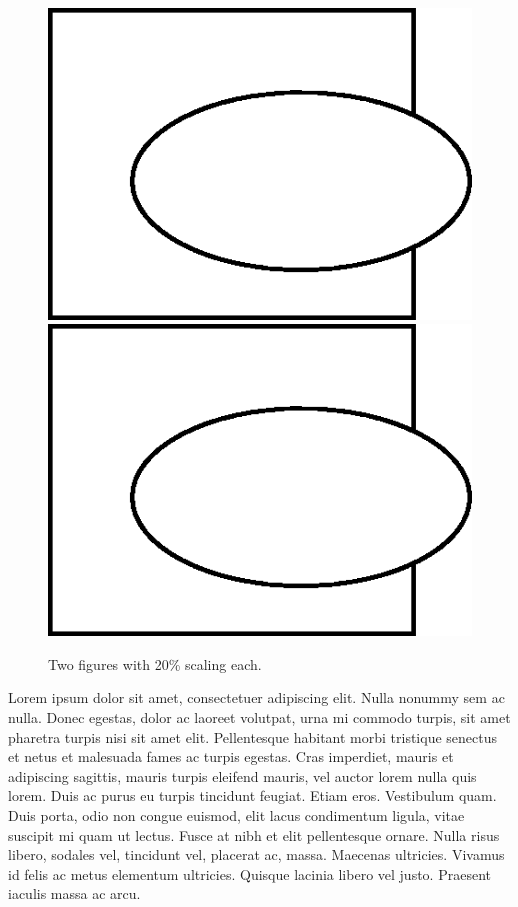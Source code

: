 \documentclass{article}
\begin{document}
\begin{figure}
\begin{center}
\includegraphics[scale=0.2]{fig_oval.png}
\includegraphics[scale=0.2]{fig_oval.png}
\end{center}
\caption{Two figures with 20\% scaling each.} 
\end{figure}

Lorem ipsum dolor sit amet, consectetuer adipiscing elit. 
Nulla nonummy sem ac nulla. Donec egestas, dolor ac laoreet volutpat, 
urna mi commodo turpis, sit amet pharetra turpis nisi sit amet elit. 
Pellentesque habitant morbi tristique senectus et netus et malesuada 
fames ac turpis egestas. Cras imperdiet, mauris et adipiscing sagittis, 
mauris turpis eleifend mauris, vel auctor lorem nulla quis lorem. 
Duis ac purus eu turpis tincidunt feugiat. Etiam eros. Vestibulum quam. 
Duis porta, odio non congue euismod, elit lacus condimentum ligula, 
vitae suscipit mi quam ut lectus. Fusce at nibh et elit pellentesque ornare. 
Nulla risus libero, sodales vel, tincidunt vel, placerat ac, massa. 
Maecenas ultricies. Vivamus id felis ac metus elementum ultricies. 
Quisque lacinia libero vel justo. Praesent iaculis massa ac arcu.
\end{document}

